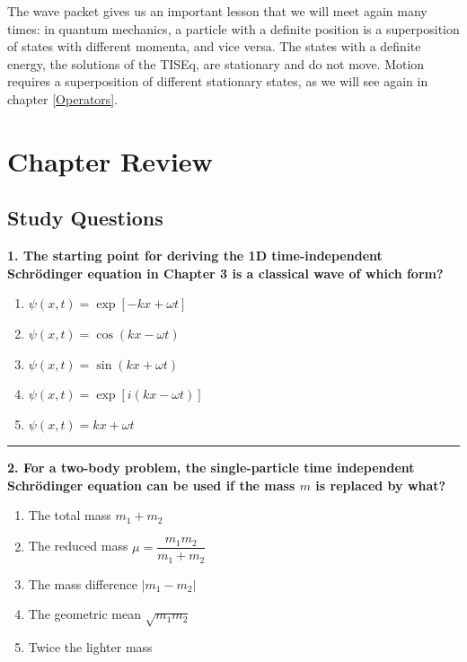 \documentclass[
  english,
  9pt,
]{extbook}
\providecommand{\tightlist}{%
  \setlength{\itemsep}{0pt}\setlength{\parskip}{0pt}}
\theoremstyle{definition}
\theoremstyle{definition}
\theoremstyle{definition}
\theoremstyle{definition}
\theoremstyle{remark}
\begin{document}
The wave packet gives us an important lesson that we will meet again many times: in quantum mechanics, a particle with a definite position is a superposition of states with different momenta, and vice versa. The states with a definite energy, the solutions of the TISEq, are stationary and do not move. Motion requires a superposition of different stationary states, as we will see again in chapter \ref{Operators}.

\section{Chapter Review}\label{rev3}

\subsection{Study Questions}\label{quest3}

\textbf{1. The starting point for deriving the 1D time-independent Schrödinger equation in Chapter 3 is a classical wave of which form?}

\begin{enumerate}
\def\labelenumi{\alph{enumi}.}
\tightlist
\item
  \(\psi(x,t) = \exp[-kx + \omega t]\)
\item
  \(\psi(x,t) = \cos(kx - \omega t)\)\\
\item
  \(\psi(x,t) = \sin(kx + \omega t)\)\\
\item
  \(\psi(x,t) = \exp[i(kx - \omega t)]\)
\item
  \(\psi(x,t) = kx + \omega t\)
\end{enumerate}

\begin{center}\rule{0.5\linewidth}{0.5pt}\end{center}

\textbf{2. For a two-body problem, the single-particle time independent Schrödinger equation can be used if the mass \(m\) is replaced by what?}

\begin{enumerate}
\def\labelenumi{\alph{enumi}.}
\tightlist
\item
  The total mass \(m_1 + m_2\)
\item
  The reduced mass \(\mu = \dfrac{m_1 m_2}{m_1 + m_2}\)
\item
  The mass difference \(|m_1 - m_2|\)
\item
  The geometric mean \(\sqrt{m_1 m_2}\)
\item
  Twice the lighter mass
\end{enumerate}
\end{document}
